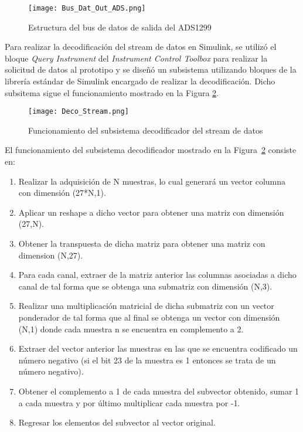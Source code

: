 \begin{figure}[htbp]
\centering
	\texttt{[image: Bus\_Dat\_Out\_ADS.png]}
	\caption{Estructura del bus de datos de salida del ADS1299}
	\label{Figura: BusOut}
\end{figure}

Para realizar la decodificación del stream de datos en Simulink, se utilizó el bloque \emph{Query Instrument} del \emph{Instrument Control Toolbox} para realizar la solicitud de datos al prototipo y se diseñó un subsistema utilizando bloques de la librería estándar de Simulink encargado de realizar la decodificación. Dicho subsitema sigue el funcionamiento mostrado en la Figura \ref{Figura: DecoStream}.\vfill

\begin{figure}[htbp]
\centering
	\texttt{[image: Deco\_Stream.png]}
	\caption{Funcionamiento del subsistema decodificador del stream de datos}
	\label{Figura: DecoStream}
\end{figure}

\newpage
El funcionamiento del subsistema decodificador mostrado en la Figura~\ref{Figura: DecoStream} consiste en:
\begin{enumerate}
	\item Realizar la adquisición de N muestras, lo cual generará un vector columna con dimensión (27*N,1).
	\item Aplicar un reshape a dicho vector para obtener una matriz con dimensión (27,N).
	\item Obtener la transpuesta de dicha matriz para obtener una matriz con dimension (N,27).
	\item Para cada canal, extraer de la matriz anterior las columnas asociadas a dicho canal de tal forma que se obtenga una submatriz con dimensión (N,3).
	\item Realizar una multiplicación matricial de dicha submatriz con un vector ponderador de tal forma que al final se obtenga un vector con dimensión (N,1) donde cada muestra n se encuentra en complemento a 2.
	\item Extraer del vector anterior las muestras en las que se encuentra codificado un número negativo (si el bit 23 de la muestra es 1 entonces se trata de un número negativo).
	\item Obtener el complemento a 1 de cada muestra del subvector obtenido, sumar 1 a cada muestra y por último multiplicar cada muestra por -1.
	\item Regresar los elementos del subvector al vector original.
\end{enumerate}

